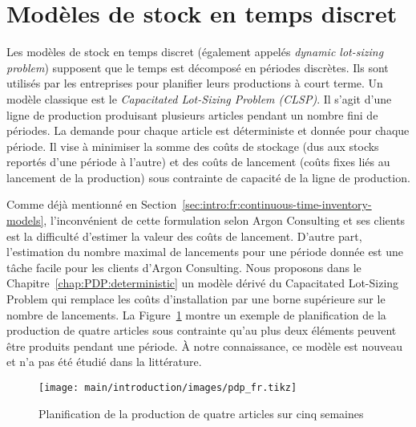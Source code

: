 \section{Modèles de stock en temps discret}
\label{sec:intro:fr:discrete-time-inventory-models}


Les modèles de stock en temps discret (également appelés \emph{dynamic lot-sizing problem}) supposent que le temps est décomposé en périodes discrètes.
Ils sont utilisés par les entreprises pour planifier leurs productions à court terme.
Un modèle classique est le \emph{Capacitated Lot-Sizing Problem (CLSP)}.
Il s'agit d'une ligne de production produisant plusieurs articles pendant un nombre fini de périodes.
La demande pour chaque article est déterministe et donnée pour chaque période.
Il vise à minimiser la somme des coûts de stockage (dus aux stocks reportés d'une période à l'autre) et des coûts de lancement (coûts fixes liés au lancement de la production) sous contrainte de capacité de la ligne de production.


Comme déjà mentionné en Section~\ref{sec:intro:fr:continuous-time-inventory-models}, l'inconvénient de cette formulation selon Argon Consulting et ses clients est la difficulté d'estimer la valeur des coûts de lancement.
D'autre part, l'estimation du nombre maximal de lancements pour une période donnée est une tâche facile pour les clients d'Argon Consulting.
Nous proposons dans le Chapitre~\ref{chap:PDP:deterministic} un modèle dérivé du Capacitated Lot-Sizing Problem qui remplace les coûts d'installation par une borne supérieure sur le nombre de lancements.
La Figure~\ref{fig:intro:fr:pdp} montre un exemple de planification de la production de quatre articles sous contrainte qu'au plus deux éléments peuvent être produits pendant une période.
\`A notre connaissance, ce modèle est nouveau et n'a pas été étudié dans la littérature.


\begin{figure}[!ht]
  \centering
  \texttt{[image: main/introduction/images/pdp\_fr.tikz]}
  \caption{Planification de la production de quatre articles sur cinq semaines}
  \label{fig:intro:fr:pdp}
\end{figure}


